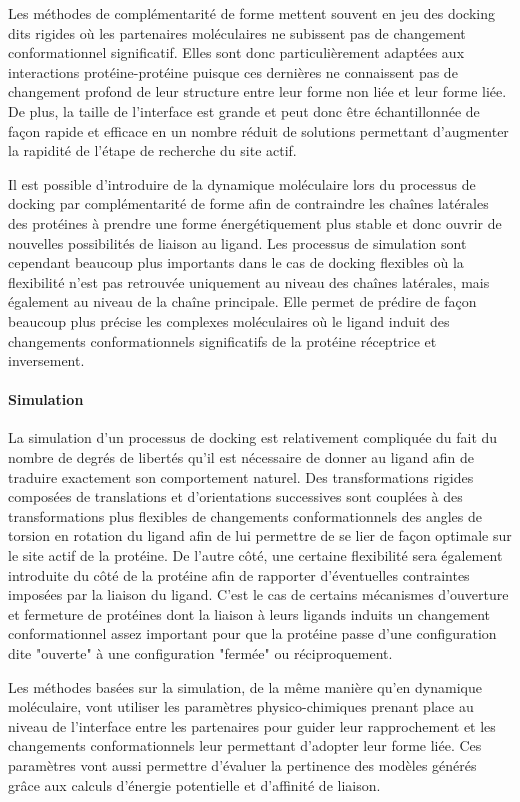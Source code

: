 Les méthodes de complémentarité de forme mettent souvent en jeu des docking dits rigides où les partenaires moléculaires ne subissent pas de changement conformationnel significatif. Elles sont donc particulièrement adaptées aux interactions protéine-protéine puisque ces dernières ne connaissent pas de changement profond de leur structure entre leur forme non liée et leur forme liée. De plus, la taille de l'interface est grande et peut donc être échantillonnée de façon rapide et efficace en un nombre réduit de solutions permettant d'augmenter la rapidité de l'étape de recherche du site actif. 

Il est possible d'introduire de la dynamique moléculaire lors du processus de docking par complémentarité de forme afin de contraindre les chaînes latérales des protéines à prendre une forme énergétiquement plus stable et donc ouvrir de nouvelles possibilités de liaison au ligand.
Les processus de simulation sont cependant beaucoup plus importants dans le cas de docking flexibles où la flexibilité n'est pas retrouvée uniquement au niveau des chaînes latérales, mais également au niveau de la chaîne principale. Elle permet de prédire de façon beaucoup plus précise les complexes moléculaires où le ligand induit des changements conformationnels significatifs de la protéine réceptrice et inversement.

\paragraph{Simulation}

La simulation d'un processus de docking est relativement compliquée du fait du nombre de degrés de libertés qu'il est nécessaire de donner au ligand afin de traduire exactement son comportement naturel. Des transformations rigides composées de translations et d'orientations successives sont couplées à des transformations plus flexibles de changements conformationnels des angles de torsion en rotation du ligand afin de lui permettre de se lier de façon optimale sur le site actif de la protéine. De l'autre côté, une certaine flexibilité sera également introduite du côté de la protéine afin de rapporter d'éventuelles contraintes imposées par la liaison du ligand. C'est le cas de certains mécanismes d'ouverture et fermeture de protéines dont la liaison à leurs ligands induits un changement conformationnel assez important pour que la protéine passe d'une configuration dite "ouverte" à une configuration "fermée" ou réciproquement.

Les méthodes basées sur la simulation, de la même manière qu'en dynamique moléculaire, vont utiliser les paramètres physico-chimiques prenant place au niveau de l'interface entre les partenaires pour guider leur rapprochement et les changements conformationnels leur permettant d'adopter leur forme liée. Ces paramètres vont aussi permettre d'évaluer la pertinence des modèles générés grâce aux calculs d'énergie potentielle et d'affinité de liaison. 

